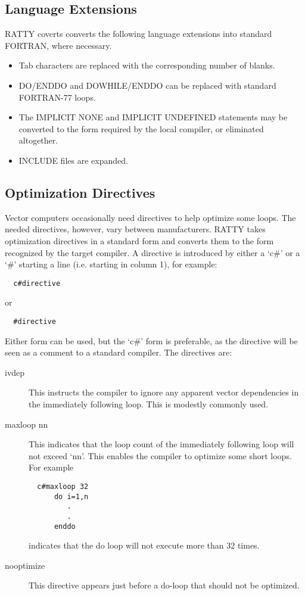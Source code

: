 \subsection{Language Extensions}
RATTY coverts converts the following language extensions into standard
FORTRAN, where necessary.
\begin{itemize}
\item Tab characters are replaced with the corresponding number of blanks.
\item DO/ENDDO and DOWHILE/ENDDO can be replaced with standard FORTRAN-77
loops.
\item The IMPLICIT NONE and IMPLICIT UNDEFINED statements may be converted
to the form required by the local compiler, or eliminated altogether.
\item INCLUDE files are expanded.
\end{itemize}

\subsection{Optimization Directives}
Vector computers occasionally need directives to help optimize some
loops. The needed directives, however, vary between manufacturers. RATTY
takes optimization directives in a standard form and converts them to
the form recognized by the target compiler. A directive is
introduced by either a
`c\#' or a `\#' starting a line (i.e. starting in column 1), for example:
\begin{verbatim}
  c#directive
\end{verbatim}
or
\begin{verbatim}
  #directive
\end{verbatim}
Either form can be used, but the `c\#' form is preferable, as 
the directive will be seen as a comment to a standard
compiler. The directives are:
\begin{description}
\item[ivdep] This instructs the compiler to ignore any apparent
vector dependencies in the immediately following loop.
This is modestly commonly used.
\item[maxloop nn] This indicates that the loop count of the immediately
following loop will not exceed `nn'. This enables the compiler to
optimize some short loops. For example
\begin{verbatim}
  c#maxloop 32
      do i=1,n
         .
         .
      enddo
\end{verbatim}
indicates that the do loop will not execute more than 32 times.
\item[nooptimize] This directive appears just before a do-loop that should
not be optimized.
\end{description}

